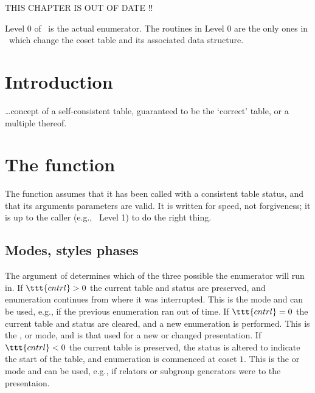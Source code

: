 


THIS CHAPTER IS OUT OF DATE !!

Level 0 of \ace\ is the actual enumerator.
The routines in Level 0 are the only ones in \ace\ which change the coset
  table and its associated data structure.

\section{Introduction}

\dots concept of a self-consistent table, guaranteed to be the `correct'
  table, or a multiple thereof.

\section{The  function}

The  function assumes that it has been called with a 
  consistent table \amp status, and that its arguments \amp parameters
  are valid.
It is written for speed, not forgiveness; it is up to the caller (e.g.,
  \ace\ Level 1) to do the right thing.

\subsection{Modes, styles \amp phases}

The  argument of  determines which of the 
  three possible  the enumerator will run in.
If $\ttt{cntrl} > 0$ the current table and status are preserved, and
  enumeration continues from where it was interrupted.
This is the  mode and can be used, e.g., if
  the previous enumeration ran out of time.
If $\ttt{cntrl} = 0$ the current table and status are cleared, and a new
  enumeration is performed.
This is the ,  or  mode, and is that used
  for a new or changed presentation.
If $\ttt{cntrl} < 0$ the current table is preserved, the status is altered
  to indicate the start of the table, and enumeration is commenced at
  coset $1$.
This is the  or  mode and can be used, e.g., if 
  relators or subgroup generators were  to the presentaion.

